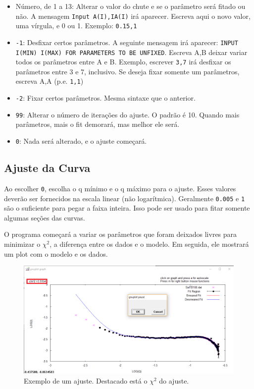 \begin{apendicesenv}
\begin{itemize}
	\item Número, de 1 a 13: Alterar o valor do chute e se o parâmetro será fitado ou não. A mensagem \texttt{Input A(I),IA(I)} irá aparecer. Escreva aqui o novo valor, uma vírgula, e 0 ou 1. Exemplo: \texttt{0.15,1}
	\item \texttt{-1}: Desfixar certos parâmetros. A seguinte mensagem irá aparecer: \texttt{INPUT I(MIN) I(MAX) FOR PARAMETERS TO BE UNFIXED}. Escreva A,B deixar variar todos os parâmetros entre A e B. Exemplo, escrever \texttt{3,7} irá desfixar os parâmetros entre 3 e 7, inclusivo. Se deseja fixar somente um parâmetros, escreva A,A (p.e. \texttt{1,1})
	\item \texttt{-2}: Fixar certos parâmetros. Mesma sintaxe que o anterior.
	\item \texttt{99}: Alterar o número de iterações do ajuste. O padrão é 10. Quando mais parâmetros, mais o fit demorará, mas melhor ele será.
	\item \texttt{0}: Nada será alterado, e o ajuste começará.
\end{itemize}

\subsection{Ajuste da Curva}
Ao escolher \texttt{0}, escolha o q mínimo e o q máximo para o ajuste. Esses valores deverão ser fornecidos na escala linear (não logarítmica). Geralmente \texttt{0.005} e \texttt{1} são o suficiente para pegar a faixa inteira. Isso pode ser usado para fitar somente algumas seções das curvas.

O programa começará a variar os parâmetros que foram deixados livres para minimizar o $\chi^2$, a diferença entre os dados e o modelo. Em seguida, ele mostrará um plot com o modelo e os dados.

\begin{figure}[h]
	\centering
	\includegraphics[scale=0.5]{./imagens/saxs/supersaxs_gnuplot_fit}
	\caption{Exemplo de um ajuste. Destacado está o $\chi^2$ do ajuste.}
\end{figure}


\end{apendicesenv}
